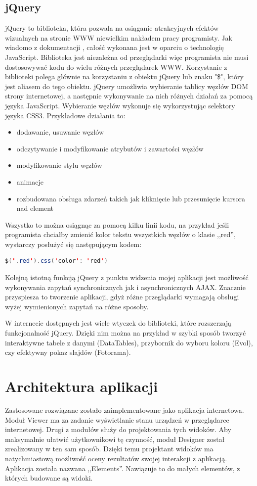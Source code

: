 \subsection{jQuery}
jQuery to biblioteka, która pozwala na osiąganie atrakcyjnych efektów wizualnych na stronie WWW niewielkim nakładem pracy programisty. Jak wiadomo z dokumentacji \cite{jquery-doc}, całość wykonana jest w oparciu o technologię JavaScript. Biblioteka jest niezależna od przeglądarki więc programista nie musi dostosowywać kodu do wielu różnych przeglądarek WWW. Korzystanie z biblioteki polega głównie na korzystaniu z obiektu jQuery lub znaku "\$", który jest aliasem do tego obiektu. jQuery umożliwia wybieranie tablicy węzłów DOM strony internetowej, a następnie wykonywanie na nich różnych działań za pomocą języka JavaScript. Wybieranie węzłów wykonuje się wykorzystując selektory języka CSS3. Przykładowe działania to:
\begin{itemize}
\item dodawanie, usuwanie węzłów
\item odczytywanie i modyfikowanie atrybutów i zawartości węzłów
\item modyfikowanie stylu węzłów
\item animacje
\item rozbudowana obsługa zdarzeń takich jak kliknięcie lub przesunięcie kursora nad element
\end{itemize}
Wszystko to można osiągnąc za pomocą kilku linii kodu, na przykład jeśli programista chciałby zmienić kolor tekstu wszystkich węzłów o klasie ,,red'', wystarczy posłużyć się następującym kodem:
\begin{lstlisting}[language=Java]
$('.red').css('color': 'red')
\end{lstlisting}
Kolejną istotną funkcją jQuery z punktu widzenia mojej aplikacji jest możliwość wykonywania zapytań synchronicznych jak i asynchronicznych AJAX. Znacznie przyspiesza to tworzenie aplikacji, gdyż różne przeglądarki wymagają obsługi wyżej wymienionych zapytań na różne sposoby. 

W internecie dostępnych jest wiele wtyczek do biblioteki, które rozszerzają funkcjonalność jQuery. Dzięki nim można na przykład w szybki sposób tworzyć interaktywne tabele z danymi (DataTables), przybornik do wyboru koloru (Evol), czy efektywny pokaz slajdów (Fotorama).

\section{Architektura aplikacji}
Zastosowane rozwiązane zostało zaimplementowane jako aplikacja internetowa. Moduł Viewer ma za zadanie wyświetlanie stanu urządzeń w przeglądarce internetowej. Drugi z modułów służy do projektowania tych widoków. Aby maksymalnie ułatwić użytkownikowi tę czynność, moduł Designer został zrealizowany w ten sam sposób. Dzięki temu projektant widoków ma natychmiastową możliwość oceny rezultatów swojej interakcji z aplikacją. Aplikacja została nazwana ,,Elements''. Nawiązuje to do małych elementów, z których budowane są widoki. 


